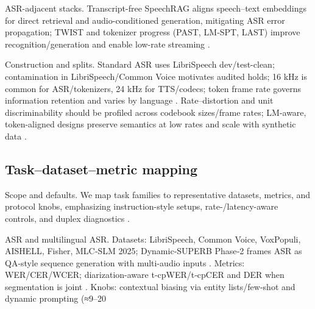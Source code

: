 \documentclass{article}
\begin{document}
ASR-adjacent stacks. Transcript-free SpeechRAG aligns speech–text embeddings for direct retrieval and audio-conditioned generation, mitigating ASR error propagation; TWIST and tokenizer progress (PAST, LM‑SPT, LAST) improve recognition/generation and enable low-rate streaming \cite{min2025speechretrievalaugmentedgenerationwithou,hassid2024textuallypretrainedspeechlanguagemodels,har-tuv2025pastphoneticacousticspeechtokenizer,jo2025lmsptalignedsemanticdistillationspeechto,turetzky2024lastlanguagemodelawarespeechtokenization}.

Construction and splits. Standard ASR uses LibriSpeech dev/test-clean; contamination in LibriSpeech/Common Voice motivates audited holds; 16 kHz is common for ASR/tokenizers, 24 kHz for TTS/codecs; token frame rate governs information retention and varies by language \cite{tseng2025evaluationllmsspeechisoftenflawedtestset,zhang2025impactframeratesspeechtokenizercasestudy,li2024investigatingneuralaudiocodecsspeechlang,ye2024codecdoesmatterexploringsemanticshortcom,li2024effectivenessacousticbpedecoderonlytts}. Rate–distortion and unit discriminability should be profiled across codebook sizes/frame rates; LM-aware, token-aligned designs preserve semantics at low rates and scale with synthetic data \cite{turetzky2024lastlanguagemodelawarespeechtokenization,maimon2025scalinganalysisinterleavedspeechtextlang,zeng2024scalingspeechtextpretrainingsyntheticint,hassid2024textuallypretrainedspeechlanguagemodels,guo2025fastlongspeechenhancinglargespeechlangua}.

\subsection{Task–dataset–metric mapping} \label{subsec:Task–dataset–metric mapping}

Scope and defaults. We map task families to representative datasets, metrics, and protocol knobs, emphasizing instruction-style setups, rate-/latency-aware controls, and duplex diagnostics \cite{vashishth2024stabspeechtokenizerassessmentbenchmark,entry2025indicsuperbspeechprocessinguniversalperf}.

ASR and multilingual ASR. Datasets: LibriSpeech, Common Voice, VoxPopuli, AISHELL, Fisher, MLC‑SLM 2025; Dynamic‑SUPERB Phase‑2 frames ASR as QA-style sequence generation with multi-audio inputs \cite{huang2025dynamicsuperbphase2collaborativelyexpand,li2025seewossubmissionmlcslmlessonslearnedspee}. Metrics: WER/CER/WCER; diarization-aware t‑cpWER/t‑cpCER and DER when segmentation is joint \cite{kando2025exploringeffectsegmentationvocabularysiz}. Knobs: contextual biasing via entity lists/few-shot and dynamic prompting (≈9–20%
\end{document}
